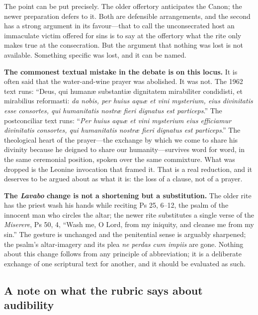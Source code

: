 The point can be put precisely. The older offertory anticipates the Canon; the newer preparation defers to it. Both are defensible arrangements, and the second has a strong argument in its favour---that to call the unconsecrated host an immaculate victim offered for sins is to say at the offertory what the rite only makes true at the consecration. But the argument that nothing was lost is not available. Something specific was lost, and it can be named.

\textbf{The commonest textual mistake in the debate is on this locus.} It is often said that the water-and-wine prayer was abolished. It was not. The 1962 text runs: ``Deus, qui humanæ substantiæ dignitatem mirabiliter condidisti, et mirabilius reformasti: \emph{da nobis, per huius aquæ et vini mysterium, eius divinitatis esse consortes, qui humanitatis nostræ fieri dignatus est particeps}.'' The postconciliar text runs: ``\emph{Per huius aquæ et vini mysterium eius efficiamur divinitatis consortes, qui humanitatis nostræ fieri dignatus est particeps}.'' The theological heart of the prayer---the exchange by which we come to share his divinity because he deigned to share our humanity---survives word for word, in the same ceremonial position, spoken over the same commixture. What was dropped is the Leonine invocation that framed it. That is a real reduction, and it deserves to be argued about as what it is: the loss of a clause, not of a prayer.

\textbf{The \emph{Lavabo} change is not a shortening but a substitution.} The older rite has the priest wash his hands while reciting Ps 25, 6--12, the psalm of the innocent man who circles the altar; the newer rite substitutes a single verse of the \emph{Miserere}, Ps 50, 4, ``Wash me, O Lord, from my iniquity, and cleanse me from my sin.'' The gesture is unchanged and the penitential sense is arguably sharpened; the psalm's altar-imagery and its plea \emph{ne perdas cum impiis} are gone. Nothing about this change follows from any principle of abbreviation; it is a deliberate exchange of one scriptural text for another, and it should be evaluated as such.

\subsection{A note on what the rubric says about audibility}

